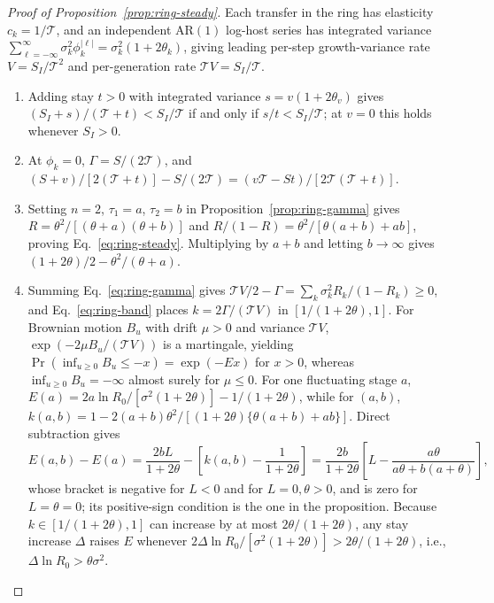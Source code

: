 \begin{proof}[Proof of Proposition~{\upshape\ref{prop:ring-steady}}]
Each transfer in the ring has elasticity $c_k = 1/\mathcal{T}$, and an independent $\mathrm{AR}(1)$ log-host series has integrated variance $\sum_{\ell=-\infty}^{\infty} \sigma_k^2 \phi_k^{|\ell|} = \sigma_k^2(1 + 2\theta_k)$, giving leading per-step growth-variance rate $V = S_I / \mathcal{T}^2$ and per-generation rate $\mathcal{T}V = S_I / \mathcal{T}$.
\begin{enumerate}
\item[(a)] Adding stay $t > 0$ with integrated variance $s = v(1 + 2\theta_v)$ gives $(S_I + s)/(\mathcal{T} + t) < S_I / \mathcal{T}$ if and only if $s/t < S_I / \mathcal{T}$; at $v = 0$ this holds whenever $S_I > 0$.
\item[(b)] At $\phi_k = 0$, $\Gamma = S/(2\mathcal{T})$, and $(S + v)/[2(\mathcal{T} + t)] - S/(2\mathcal{T}) = (v\mathcal{T} - St)/[2\mathcal{T}(\mathcal{T} + t)]$.
\item[(c)] Setting $n = 2$, $\tau_1 = a$, $\tau_2 = b$ in Proposition~\ref{prop:ring-gamma} gives $R = \theta^2/[(\theta + a)(\theta + b)]$ and $R/(1 - R) = \theta^2/[\theta(a + b) + ab]$, proving Eq.~\eqref{eq:ring-steady}. Multiplying by $a + b$ and letting $b \to \infty$ gives $(1 + 2\theta)/2 - \theta^2/(\theta + a)$.
\item[(d)] Summing Eq.~\eqref{eq:ring-gamma} gives $\mathcal{T}V/2 - \Gamma = \sum_k \sigma_k^2 R_k/(1 - R_k) \ge 0$, and Eq.~\eqref{eq:ring-band} places $k = 2\Gamma/(\mathcal{T}V)$ in $[1/(1 + 2\theta), 1]$. For Brownian motion $B_u$ with drift $\mu > 0$ and variance $\mathcal{T}V$, $\exp(-2\mu B_u/(\mathcal{T}V))$ is a martingale, yielding $\Pr(\inf_{u \ge 0} B_u \le -x) = \exp(-Ex)$ for $x > 0$, whereas $\inf_{u \ge 0} B_u = -\infty$ almost surely for $\mu \le 0$. For one fluctuating stage $a$, $E(a) = 2a\ln R_0 / [\sigma^2(1 + 2\theta)] - 1/(1 + 2\theta)$, while for $(a,b)$, $k(a,b) = 1 - 2(a + b)\theta^2/[(1 + 2\theta)\{\theta(a + b) + ab\}]$. Direct subtraction gives
\[
E(a,b) - E(a) = \frac{2b L}{1 + 2\theta} - \left[k(a,b) - \frac{1}{1 + 2\theta}\right] = \frac{2b}{1 + 2\theta}\left[L - \frac{a\theta}{a\theta + b(a + \theta)}\right],
\]
whose bracket is negative for $L<0$ and for $L=0,\theta>0$, and is zero for $L=\theta=0$; its positive-sign condition is the one in the proposition. Because $k \in [1/(1 + 2\theta), 1]$ can increase by at most $2\theta/(1 + 2\theta)$, any stay increase $\Delta$ raises $E$ whenever $2\Delta\ln R_0 / [\sigma^2(1 + 2\theta)] > 2\theta/(1 + 2\theta)$, i.e., $\Delta\ln R_0 > \theta\sigma^2$. \qedhere
\end{enumerate}
\end{proof}

